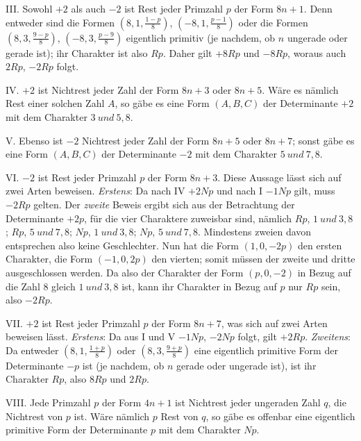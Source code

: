 III. Sowohl $+2$ als auch $-2$ ist Rest jeder Primzahl $p$ der Form $8n+1$. Denn entweder sind die Formen $\left(8,\allowbreak 1,\allowbreak \frac{1-p}{8}\right)$, $\left(-8,\allowbreak 1,\allowbreak \frac{p-1}{8}\right)$ oder die Formen $\left(8,\allowbreak 3,\allowbreak \frac{9-p}{8}\right)$, $\left(-8,\allowbreak 3,\allowbreak \frac{p-9}{8}\right)$ eigentlich primitiv (je nachdem, ob $n$ ungerade oder gerade ist); ihr Charakter ist also $Rp$. Daher gilt $+8Rp$ und $-8Rp$, woraus auch $2Rp$, $-2Rp$ folgt.

IV. $+2$ ist Nichtrest jeder Zahl der Form $8n+3$ oder $8n+5$. Wäre es nämlich Rest einer solchen Zahl $A$, so gäbe es eine Form $(A,B,C)$ der Determinante $+2$ mit dem Charakter $3\ \mathit{und}\ 5,8$.

V. Ebenso ist $-2$ Nichtrest jeder Zahl der Form $8n+5$ oder $8n+7$; sonst gäbe es eine Form $(A,B,C)$ der Determinante $-2$ mit dem Charakter $5\ \mathit{und}\ 7,8$.

VI. $-2$ ist Rest jeder Primzahl $p$ der Form $8n+3$. Diese Aussage lässt sich auf zwei Arten beweisen. \textit{Erstens}: Da nach IV $+2Np$ und nach I $-1Np$ gilt, muss $-2Rp$ gelten. Der \textit{zweite} Beweis ergibt sich aus der Betrachtung der Determinante $+2p$, für die vier Charaktere zuweisbar sind, nämlich $Rp$, $1\ \mathit{und}\ 3,8$; $Rp$, $5\ \mathit{und}\ 7,8$; $Np$, $1\ \mathit{und}\ 3,8$; $Np$, $5\ \mathit{und}\ 7,8$. Mindestens zweien davon entsprechen also keine Geschlechter. Nun hat die Form
$(1,0,-2p)$ den ersten Charakter, die Form $(-1,0,2p)$ den vierten; somit müssen der zweite und dritte ausgeschlossen werden. Da also der Charakter der Form $(p,0,-2)$ in Bezug auf die Zahl $8$ gleich $1\ \mathit{und}\ 3,8$ ist, kann ihr Charakter in Bezug auf $p$ nur $Rp$ sein, also $-2Rp$.

VII. $+2$ ist Rest jeder Primzahl $p$ der Form $8n+7$, was sich auf zwei Arten beweisen lässt. \textit{Erstens}: Da aus I und V $-1Np$, $-2Np$ folgt, gilt $+2Rp$. \textit{Zweitens}: Da entweder $\left(8,\allowbreak 1,\allowbreak \frac{1+p}{8}\right)$ oder $\left(8,\allowbreak 3,\allowbreak \frac{9+p}{8}\right)$ eine eigentlich primitive Form der Determinante $-p$ ist (je nachdem, ob $n$ gerade oder ungerade ist), ist ihr Charakter $Rp$, also $8Rp$ und $2Rp$.

VIII. Jede Primzahl $p$ der Form $4n+1$ ist Nichtrest jeder ungeraden Zahl $q$, die Nichtrest von $p$ ist. Wäre nämlich $p$ Rest von $q$, so gäbe es offenbar eine eigentlich primitive Form der Determinante $p$ mit dem Charakter $Np$.

